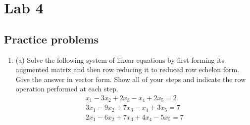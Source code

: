 \documentclass{article}
\begin{document}
\section{Lab 4}
\subsection{Practice problems}
\begin{enumerate}
	\item (a) Solve the following system of linear equations by first forming its augmented matrix and then row reducing it to reduced row echelon form. Give the answer in vector form. Show all of your steps and indicate the row operation performed at each step.
$$
\begin{array}{r}
x_1-3 x_2+2 x_3-x_4+2 x_5=2 \\
3 x_1-9 x_2+7 x_3-x_4+3 x_5=7 \\
2 x_1-6 x_2+7 x_3+4 x_4-5 x_5=7
\end{array}
$$


\end{enumerate}
\end{document}
